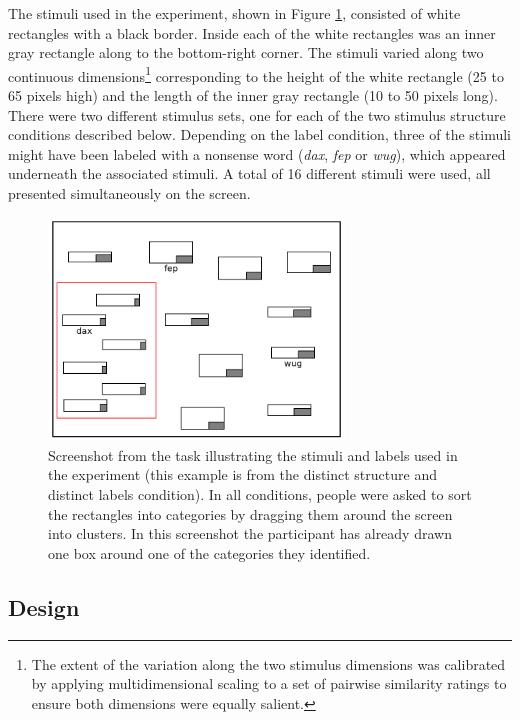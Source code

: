 \documentclass[a4paper, doc]{apa6}
\begin{document}
The stimuli used in the experiment, shown in Figure \ref{experiment-demo}, consisted of white rectangles with a black border. Inside each of the white rectangles was an inner gray rectangle along to the bottom-right corner. The stimuli varied along two continuous dimensions\footnote{The extent of the variation along the two stimulus dimensions was calibrated by applying multidimensional scaling to a set of pairwise similarity ratings to ensure both dimensions were equally salient.} corresponding to the height of the white rectangle (25 to 65 pixels high) and the length of the inner gray rectangle (10 to 50 pixels long). There were two different stimulus sets, one for each of the two stimulus structure conditions described below. Depending on the label condition, three of the stimuli might have been labeled with a nonsense word (\textit{dax}, \textit{fep} or \textit{wug}), which appeared underneath the associated stimuli. A total of 16 different stimuli were used, all presented simultaneously on the screen.

\begin{figure}[t]
  \begin{center}
    \includegraphics[width=0.7\textwidth]{figures/semi-supervised-demo.png}
    \caption{Screenshot from the task illustrating the stimuli and labels used in the experiment (this example is from the {\sc distinct structure} and {\sc distinct labels} condition). In all conditions, people were asked to sort the rectangles into categories by dragging them around the screen into clusters. In this screenshot the participant has already drawn one box around one of the categories they identified.}
    \label{experiment-demo}
  \end{center}
\end{figure}

\subsection{Design}
\end{document}
